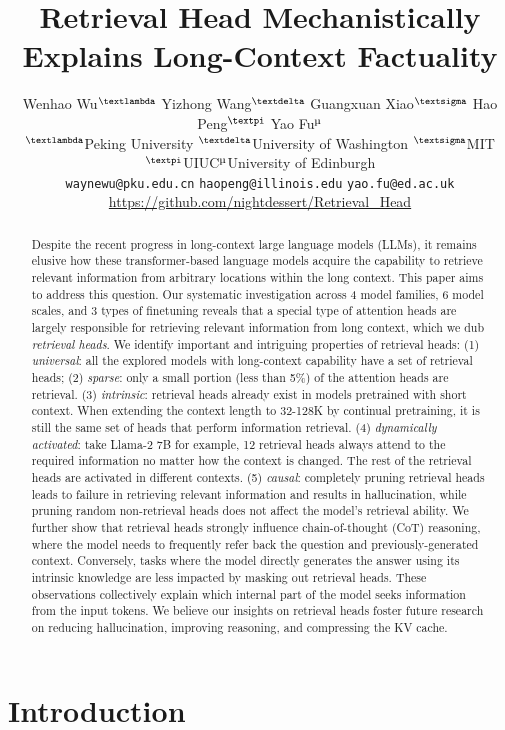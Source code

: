 \documentclass{article}
\title{Retrieval Head Mechanistically Explains Long-Context Factuality}
\author{
  Wenhao Wu$^\text{\textlambda}$\quad\quad 
  Yizhong Wang$^\text{\textdelta}$\quad\quad 
  Guangxuan Xiao$^\text{\textsigma}$\quad\quad
  Hao Peng$^\text{\textpi}$\quad\quad
  Yao Fu$^\text{\textmu}$\\
  $^\text{\textlambda}$Peking University\quad 
  $^\text{\textdelta}$University of Washington\quad
  $^\text{\textsigma}$MIT\quad 
  $^\text{\textpi}$UIUC\quad $^\text{\textmu}$University of Edinburgh\\
  \texttt{waynewu@pku.edu.cn}\quad\quad 
  \texttt{haopeng@illinois.edu}\quad\quad 
  \texttt{yao.fu@ed.ac.uk} \\
  \url{https://github.com/nightdessert/Retrieval_Head}\\ 
}
\begin{document}
\maketitle
\begin{abstract}
Despite the recent progress in long-context large language models (LLMs), it remains elusive how these transformer-based language models acquire the capability to retrieve relevant information from arbitrary locations within the long context. This paper aims to address this question.
Our systematic investigation across 4 model families, 6 model scales, and 3 types of finetuning reveals that a special type of attention heads are largely responsible for retrieving relevant information from long context, which we dub \emph{retrieval heads}.
We identify important and intriguing properties of retrieval heads:
(1) \textit{universal}: 
 all the explored models with long-context capability have a set of retrieval heads;
(2) \textit{sparse}: only a small portion (less than 5\%) of the attention heads are retrieval. 
(3) \textit{intrinsic}: retrieval heads already exist in
models pretrained with short context.
When extending the context length to 32-128K by continual pretraining, 
it is still the same set of heads that perform information retrieval.
(4) \textit{dynamically activated}: 
take Llama-2 7B for example, 12 
retrieval heads always attend to the required information no matter how the context is changed.
The rest of the retrieval heads are activated in different contexts.
(5) \textit{causal}: 
completely pruning retrieval heads leads to failure in retrieving relevant information and results in hallucination, while pruning random non-retrieval heads does not affect the model's retrieval ability.
We further show that retrieval heads strongly influence 
chain-of-thought (CoT) reasoning, where the model needs to frequently refer back the question and previously-generated context.
Conversely, tasks where the model directly generates the answer using its intrinsic knowledge
are less impacted by masking out retrieval heads. 
These observations collectively explain which internal part of the model seeks information from the input tokens.
We believe our insights on retrieval heads foster future research on reducing hallucination, improving reasoning, and compressing the KV cache.
\end{abstract}


\section{Introduction}
\label{sec:intro}

\end{document}

